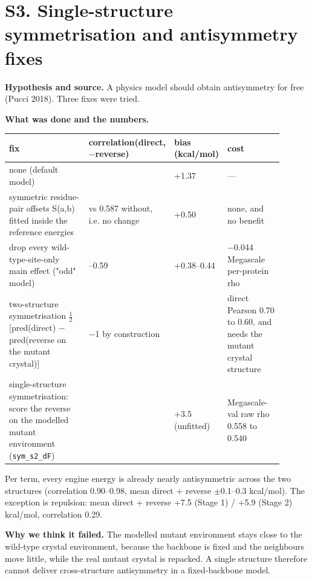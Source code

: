 \documentclass[11pt,a4paper]{article}
\begin{document}
\section{S3. Single-structure symmetrisation and antisymmetry fixes}

\textbf{Hypothesis and source.} A physics model should obtain antisymmetry for free (Pucci 2018). Three fixes were
tried.

\textbf{What was done and the numbers.}

\begin{center}\scriptsize
\begin{tabular}{@{}>{\raggedright\arraybackslash}p{0.409\linewidth}>{\raggedright\arraybackslash}p{0.153\linewidth}>{\raggedright\arraybackslash}p{0.062\linewidth}>{\raggedright\arraybackslash}p{0.277\linewidth}@{}}
\toprule
fix & correlation(direct, $-$reverse) & bias (kcal/mol) & cost \\
\midrule
none (default model) & 0.25 & +1.37 & --- \\
symmetric residue-pair offsets S(a,b) fitted inside the reference energies & 0.59 vs 0.587 without, i.e. no change & +0.50 & none, and no benefit \\
drop every wild-type-site-only main effect ("odd" model) & 0.57--0.59 & +0.38--0.44 & $-$0.044 Megascale per-protein rho \\
two-structure symmetrisation $\tfrac{1}{2}$[pred(direct) $-$ pred(reverse on the mutant crystal)] & $-$1 by construction & 0 & direct Pearson 0.70 to 0.60, and needs the mutant crystal structure \\
single-structure symmetrisation: score the reverse on the modelled mutant environment (\texttt{sym\_s2\_dF}) & 0.15 & +3.5 (unfitted) & Megascale-val raw rho 0.558 to 0.540 \\
\bottomrule
\end{tabular}\end{center}

Per term, every engine energy is already nearly antisymmetric across the two structures (correlation 0.90--0.98,
mean direct + reverse $\pm$0.1--0.3 kcal/mol). The exception is repulsion: mean direct + reverse +7.5 (Stage 1) /
+5.9 (Stage 2) kcal/mol, correlation 0.29.

\textbf{Why we think it failed.} The modelled mutant environment stays close to the wild-type crystal environment,
because the backbone is fixed and the neighbours move little, while the real mutant crystal is repacked. A
single structure therefore cannot deliver cross-structure antisymmetry in a fixed-backbone model.
\end{document}
